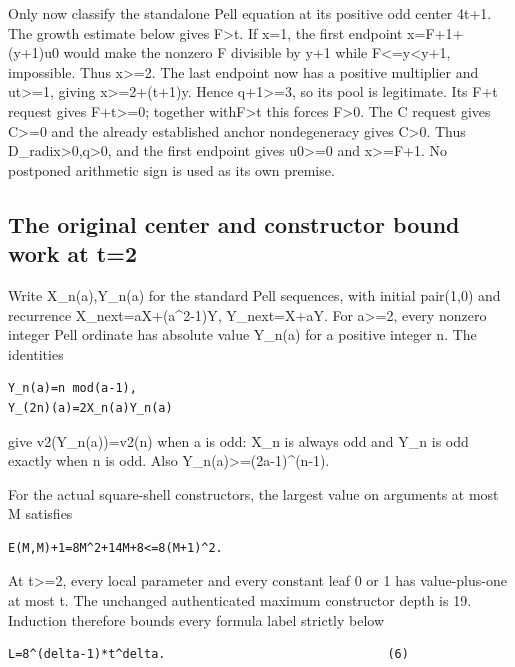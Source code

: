 Only now classify the standalone Pell equation at its positive odd
center 4t+1. The growth estimate below gives
\textbar F\textbar\textgreater t. If x=1, the first endpoint
x=F+1+(y+1)u0 would make the nonzero F divisible by y+1 while
\textbar F\textbar\textless=y\textless y+1, impossible. Thus
x\textgreater=2. The last endpoint now has a positive multiplier and
ut\textgreater=1, giving x\textgreater=2+(t+1)y. Hence
\textbar q+1\textbar\textgreater=3, so its pool is legitimate. Its F+t
request gives F+t\textgreater=0; together
with\textbar F\textbar\textgreater t this forces F\textgreater0. The C
request gives C\textgreater=0 and the already established anchor
nondegeneracy gives C\textgreater0. Thus
D\_radix\textgreater0,q\textgreater0, and the first endpoint gives
u0\textgreater=0 and x\textgreater=F+1. No postponed arithmetic sign is
used as its own premise.

\subsection{The original center and constructor bound work at
t=2}\label{the-original-center-and-constructor-bound-work-at-t2}

Write X\_n(a),Y\_n(a) for the standard Pell sequences, with initial
pair(1,0) and recurrence X\_next=aX+(a\^{}2-1)Y, Y\_next=X+aY. For
a\textgreater=2, every nonzero integer Pell ordinate has absolute value
Y\_n(a) for a positive integer n. The identities

\begin{verbatim}
Y_n(a)=n mod(a-1),
Y_(2n)(a)=2X_n(a)Y_n(a)
\end{verbatim}

give v2(Y\_n(a))=v2(n) when a is odd: X\_n is always odd and Y\_n is odd
exactly when n is odd. Also Y\_n(a)\textgreater=(2a-1)\^{}(n-1).

For the actual square-shell constructors, the largest value on arguments
at most M satisfies

\begin{verbatim}
E(M,M)+1=8M^2+14M+8<=8(M+1)^2.
\end{verbatim}

At t\textgreater=2, every local parameter and every constant leaf 0 or 1
has value-plus-one at most t. The unchanged authenticated maximum
constructor depth is 19. Induction therefore bounds every formula label
strictly below

\begin{verbatim}
L=8^(delta-1)*t^delta.                               (6)
\end{verbatim}

